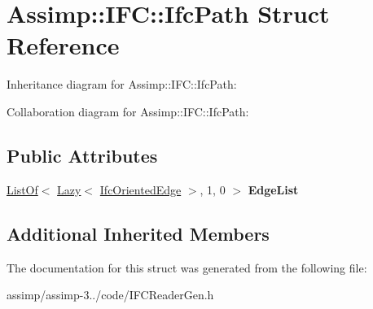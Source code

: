 \hypertarget{struct_assimp_1_1_i_f_c_1_1_ifc_path}{\section{Assimp\+:\+:I\+F\+C\+:\+:Ifc\+Path Struct Reference}
\label{struct_assimp_1_1_i_f_c_1_1_ifc_path}
}


Inheritance diagram for Assimp\+:\+:I\+F\+C\+:\+:Ifc\+Path\+:


Collaboration diagram for Assimp\+:\+:I\+F\+C\+:\+:Ifc\+Path\+:
\subsection*{Public Attributes}
\begin{DoxyCompactItemize}
\item 
\hypertarget{struct_assimp_1_1_i_f_c_1_1_ifc_path_a66b70a591f58cffc8bada18365b95543}{\hyperlink{struct_assimp_1_1_s_t_e_p_1_1_list_of}{List\+Of}$<$ \hyperlink{struct_assimp_1_1_s_t_e_p_1_1_lazy}{Lazy}$<$ \hyperlink{struct_assimp_1_1_i_f_c_1_1_ifc_oriented_edge}{Ifc\+Oriented\+Edge} $>$, 1, 0 $>$ {\bfseries Edge\+List}}\label{struct_assimp_1_1_i_f_c_1_1_ifc_path_a66b70a591f58cffc8bada18365b95543}

\end{DoxyCompactItemize}
\subsection*{Additional Inherited Members}


The documentation for this struct was generated from the following file\+:\begin{DoxyCompactItemize}
\item 
assimp/assimp-\/3../code/I\+F\+C\+Reader\+Gen.\+h\end{DoxyCompactItemize}
